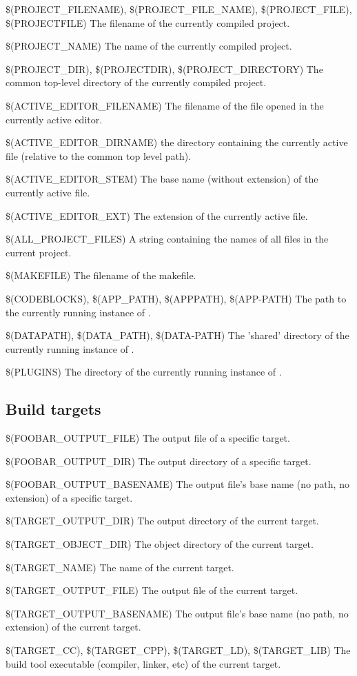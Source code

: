 \begin{codeentry}
\item[\$(PROJECT\_FILENAME), \$(PROJECT\_FILE\_NAME), \$(PROJECT\_FILE), \$(PROJECTFILE)] The filename of the currently compiled project.
\item[\$(PROJECT\_NAME)] The name of the currently compiled project.
\item[\$(PROJECT\_DIR), \$(PROJECTDIR), \$(PROJECT\_DIRECTORY)] The common top-level directory of the currently compiled project.
\item[\$(ACTIVE\_EDITOR\_FILENAME)] The filename of the file opened in the currently active editor.
\item[\$(ACTIVE\_EDITOR\_DIRNAME)] the directory containing the currently active file (relative to the common top level path).
\item[\$(ACTIVE\_EDITOR\_STEM)] The base name (without extension) of the currently active file.
\item[\$(ACTIVE\_EDITOR\_EXT)] The extension of the currently active file.
\item[\$(ALL\_PROJECT\_FILES)] A string containing the names of all files in the current project.
\item[\$(MAKEFILE)] The filename of the makefile.
\item[\$(CODEBLOCKS), \$(APP\_PATH), \$(APPPATH), \$(APP-PATH)] The path to the currently running instance of \codeblocks.
\item[\$(DATAPATH), \$(DATA\_PATH), \$(DATA-PATH)] The 'shared' directory of the currently running instance of \codeblocks.
\item[\$(PLUGINS)] The  directory of the currently running instance of \codeblocks.
\end{codeentry}

\subsection{Build targets}

\begin{codeentry}
\item[\$(FOOBAR\_OUTPUT\_FILE)] The output file of a specific target.
\item[\$(FOOBAR\_OUTPUT\_DIR)] The output directory of a specific target.
\item[\$(FOOBAR\_OUTPUT\_BASENAME)] The output file's base name (no path, no extension) of a specific target.
\item[\$(TARGET\_OUTPUT\_DIR)] The output directory of the current target.
\item[\$(TARGET\_OBJECT\_DIR)] The object directory of the current target.
\item[\$(TARGET\_NAME)] The name of the current target.
\item[\$(TARGET\_OUTPUT\_FILE)] The output file of the current target.
\item[\$(TARGET\_OUTPUT\_BASENAME)] The output file's base name (no path, no extension) of the current target.
\item[\$(TARGET\_CC), \$(TARGET\_CPP), \$(TARGET\_LD), \$(TARGET\_LIB)] The build tool executable (compiler, linker, etc) of the current target.
\end{codeentry}

